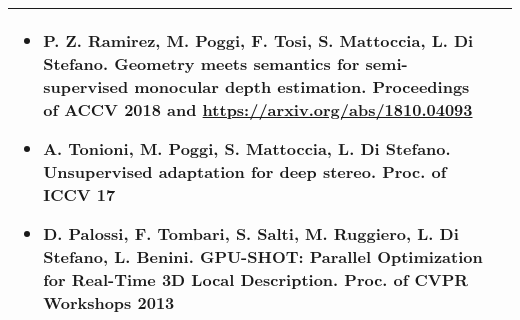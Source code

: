 \begin{center}
{\begin{tabular}{@{}p{25mm}|p{190mm}@{}}
{\begin{itemize}
\item P. Z. Ramirez, M. Poggi, F. Tosi, S. Mattoccia, L. Di Stefano. Geometry meets semantics for semi-supervised monocular depth estimation. Proceedings of ACCV 2018 and \href{arXiv:1810.0493}{https://arxiv.org/abs/1810.04093}
\item A. Tonioni, M. Poggi, S. Mattoccia, L. Di Stefano. Unsupervised adaptation for deep stereo. 
Proc. of ICCV 17%
\item D. Palossi, F. Tombari, S. Salti, M. Ruggiero, L. Di Stefano, L. Benini. GPU-SHOT: Parallel Optimization for Real-Time 3D Local Description. Proc. of CVPR Workshops 2013%
\end{itemize}}\tabularnewline\bottomrule

\end{tabular}
}%
\end{center}
 